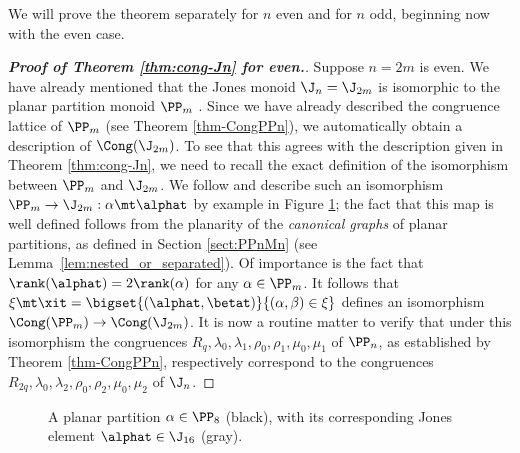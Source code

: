 We will prove the theorem separately for $n$ even and for $n$ odd, beginning now with the even case.  




\begin{proof}[{\bf Proof of Theorem \ref{thm:cong-Jn} for  even.}]
Suppose $n=2m$ is even.  We have already mentioned that the Jones monoid $\J_n=\J_{2m}$ is isomorphic to the planar partition monoid $\PP_m$ \cite{HR2005,Jones1994_2}.  
%
Since we have already described the congruence lattice of $\PP_m$ (see Theorem \ref{thm-CongPPn}), we automatically obtain a description of $\Cong(\J_{2m})$.  To see that this agrees with the description given in Theorem \ref{thm:cong-Jn}, we need to recall the exact definition of the isomorphism between $\PP_m$ and $\J_{2m}$.  
We follow \cite[p873]{HR2005} and describe such an isomorphism $\PP_m\to\J_{2m}:\alpha\mt\alphat$ by example in Figure \ref{fig:PmJ2m}; the fact that this map is well defined follows from the planarity of the \emph{canonical graphs} of planar partitions, as defined in Section \ref{sect:PPnMn} (see Lemma~\ref{lem:nested_or_separated}).  Of importance is the fact that $\rank(\alphat)=2\rank(\alpha)$ for any $\alpha\in\PP_m$.
%
 It follows that $\xi\mt\xit=\bigset{(\alphat,\betat)}{(\alpha,\beta)\in\xi}$ defines an isomorphism $\Cong(\PP_m)\to\Cong(\J_{2m})$.  
It is now a routine matter to verify that under this isomorphism the congruences $R_q,\lambda_0,\lambda_1,\rho_0,\rho_1,\mu_0,\mu_1$ of $\PP_n$, as established by Theorem \ref{thm-CongPPn}, respectively correspond to the congruences
$R_{2q},\lambda_0,\lambda_2,\rho_0,\rho_2,\mu_0,\mu_2$ of $\J_n$.
\end{proof}



\begin{figure}[ht]
\begin{center}
\end{center}
\vspace{-5mm}
\caption{A planar partition $\alpha\in\PP_8$ (black), with its corresponding Jones element $\alphat\in\J_{16}$ (gray).}
\label{fig:PmJ2m}
\end{figure}


